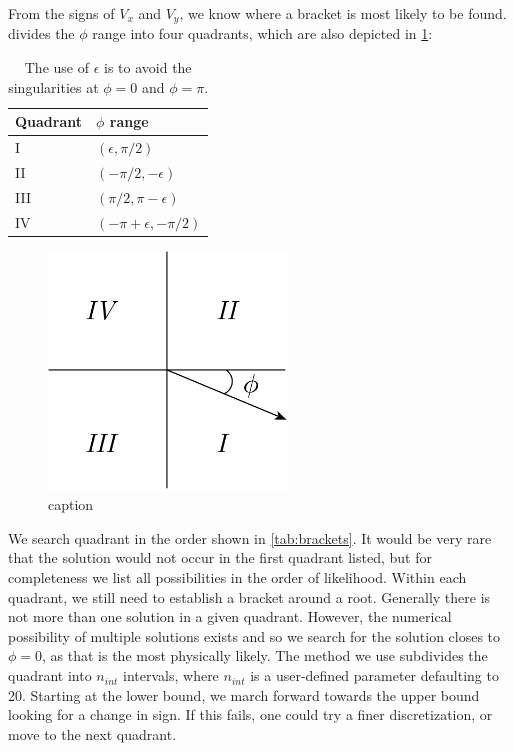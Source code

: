 \documentclass{article}
\begin{document}
From the signs of $V_x$ and $V_y$, we know where a bracket is most likely to be found.   divides the $\phi$ range into four quadrants, which are also depicted in \cref{fig:quadrants}:
\begin{table}[htb]
\centering
\caption{The use of $\epsilon$ is to avoid the singularities at $\phi = 0$ and $\phi = \pi$.}
\label{tab:quadrants}
\begin{tabular}{@{}ll@{}}
\toprule
Quadrant & $\phi$ range\\
\midrule
I & $(\epsilon, \pi/2)$ \\
II & $(-\pi/2, -\epsilon)$ \\
III & $(\pi/2, \pi-\epsilon)$ \\
IV & $(-\pi+\epsilon, -\pi/2)$ \\
\bottomrule
\end{tabular}
\end{table}
\begin{figure}[htbp]
\centering
\includegraphics[width=2.5in]{figures/quadrants}
\caption{caption}
\label{fig:quadrants}
\end{figure}

We search quadrant in the order shown in \cref{tab:brackets}.  It would be very rare that the solution would not occur in the first quadrant listed, but for completeness we list all possibilities in the order of likelihood.  Within each quadrant, we still need to establish a bracket around a root.  Generally there is not more than one solution in a given quadrant.  However, the numerical possibility of multiple solutions exists and so we search for the solution closes to $\phi = 0$, as that is the most physically likely.  The method we use subdivides the quadrant into $n_{int}$ intervals, where $n_{int}$ is a user-defined parameter defaulting to 20.  Starting at the lower bound, we march forward towards the upper bound looking for a change in sign.  If this fails, one could try a finer discretization, or move to the next quadrant.
\end{document}
